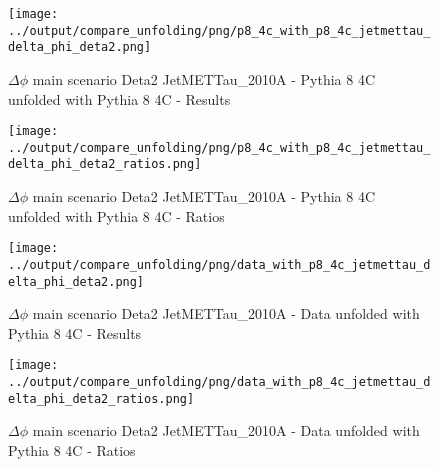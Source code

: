\documentclass[11pt]{book}
\begin{document}
\begin{figure}[ht]
\centering
\texttt{[image: ../output/compare\_unfolding/png/p8\_4c\_with\_p8\_4c\_jetmettau\_delta\_phi\_deta2.png]}
\caption{$\Delta\phi$ main scenario Deta2 JetMETTau\_2010A - Pythia 8 4C unfolded with Pythia 8 4C - Results}
\label{p8_p8_jetmettau_delta_phi_deta2_a}
\end{figure}

\begin{figure}[ht]
\centering
\texttt{[image: ../output/compare\_unfolding/png/p8\_4c\_with\_p8\_4c\_jetmettau\_delta\_phi\_deta2\_ratios.png]}
\caption{$\Delta\phi$ main scenario Deta2 JetMETTau\_2010A - Pythia 8 4C unfolded with Pythia 8 4C - Ratios}
\label{p8_p8_jetmettau_delta_phi_deta2_b}
\end{figure}

\begin{comment}

\begin{figure}[ht]
\centering
\texttt{[image: ../output/compare\_unfolding/png/p6\_z2\_with\_p8\_4c\_jetmettau\_delta\_phi\_deta2.png]}
\caption{$\Delta\phi$ main scenario Deta2 JetMETTau\_2010A - Pythia 6 Z2* unfolded with Pythia 8 4C - Results}
\label{p6_p8_jetmettau_delta_phi_deta2_a}
\end{figure}

\begin{figure}[ht]
\centering
\texttt{[image: ../output/compare\_unfolding/png/p6\_z2\_with\_p8\_4c\_jetmettau\_delta\_phi\_deta2\_ratios.png]}
\caption{$\Delta\phi$ main scenario Deta2 JetMETTau\_2010A - Pythia 6 Z2* unfolded with Pythia 8 4C - Ratios}
\label{p6_p8_jetmettau_delta_phi_deta2_b}
\end{figure}

\end{comment}

\begin{figure}[ht]
\centering
\texttt{[image: ../output/compare\_unfolding/png/data\_with\_p8\_4c\_jetmettau\_delta\_phi\_deta2.png]}
\caption{$\Delta\phi$ main scenario Deta2 JetMETTau\_2010A - Data unfolded with Pythia 8 4C - Results}
\label{data_p8_jetmettau_delta_phi_deta2_a}
\end{figure}

\begin{figure}[ht]
\centering
\texttt{[image: ../output/compare\_unfolding/png/data\_with\_p8\_4c\_jetmettau\_delta\_phi\_deta2\_ratios.png]}
\caption{$\Delta\phi$ main scenario Deta2 JetMETTau\_2010A - Data unfolded with Pythia 8 4C - Ratios}
\label{data_p8_jetmettau_delta_phi_deta2_b}
\end{figure}
\end{document}
